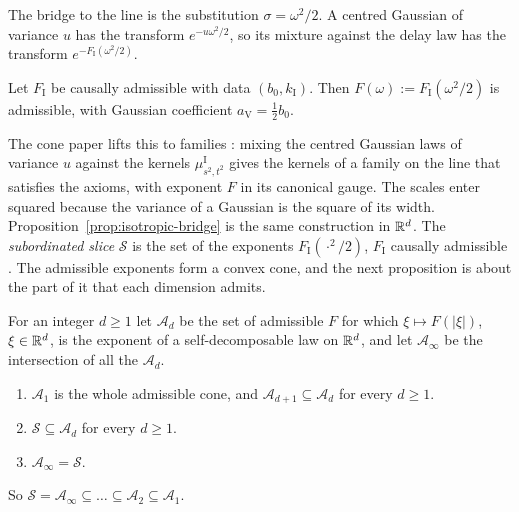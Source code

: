 The bridge to the line is the substitution $\sigma = \omega^2/2$. A centred Gaussian of variance
$u$ has the transform $e^{-u\omega^2/2}$, so its mixture against the delay law has the transform
$e^{-F_{\mathrm I}(\omega^2/2)}$.

\begin{proposition}\label{prop:line-bridge}
Let $F_{\mathrm I}$ be causally admissible with data $(b_0, k_{\mathrm I})$. Then
$F(\omega) := F_{\mathrm I}(\omega^2/2)$ is admissible, with Gaussian coefficient
$a_{\mathrm V} = \tfrac12 b_0$.
\end{proposition}

The cone paper lifts this to families : mixing the centred Gaussian laws of
variance $u$ against the kernels $\mu^{\mathrm I}_{s^2,t^2}$ gives the kernels of a family on the
line that satisfies the axioms, with exponent $F$ in its canonical gauge. The scales enter squared
because the variance of a Gaussian is the square of its width.
Proposition~\ref{prop:isotropic-bridge} is the same construction in $\mathbb{R}^d$. The
\emph{subordinated slice} $\mathcal{S}$ is the set of the exponents $F_{\mathrm I}(\cdot^2/2)$,
$F_{\mathrm I}$ causally admissible . The admissible exponents form a convex
cone, and the next proposition is about the part of it that each dimension admits.

\begin{proposition}\label{prop:line-filtration}
For an integer $d \ge 1$ let $\mathcal{A}_d$ be the set of admissible $F$ for which
$\xi \mapsto F(|\xi|)$, $\xi \in \mathbb{R}^d$, is the exponent of a self-decomposable law on $\mathbb{R}^d$, and
let $\mathcal{A}_\infty$ be the intersection of all the $\mathcal{A}_d$.
\begin{enumerate}
\item $\mathcal{A}_1$ is the whole admissible cone, and $\mathcal{A}_{d+1} \subseteq \mathcal{A}_d$
for every $d \ge 1$.
\item $\mathcal{S} \subseteq \mathcal{A}_d$ for every $d \ge 1$.
\item $\mathcal{A}_\infty = \mathcal{S}$.
\end{enumerate}
So $\mathcal{S} = \mathcal{A}_\infty \subseteq \dots \subseteq \mathcal{A}_2 \subseteq
\mathcal{A}_1$.
\end{proposition}

